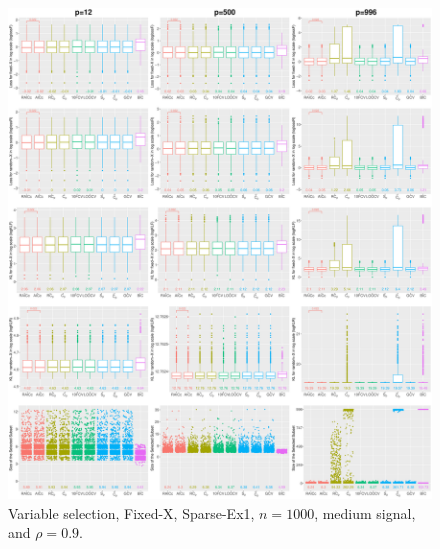 \begin{figure}[!ht]
\centering
\includegraphics[width=\textwidth]{figures/supplement/fixedx/subset_selection/Sparse-Ex1_n1000_msnr_rho09.eps}
\caption{Variable selection, Fixed-X, Sparse-Ex1, $n=1000$, medium signal, and $\rho=0.9$.}
\end{figure}
\clearpage
